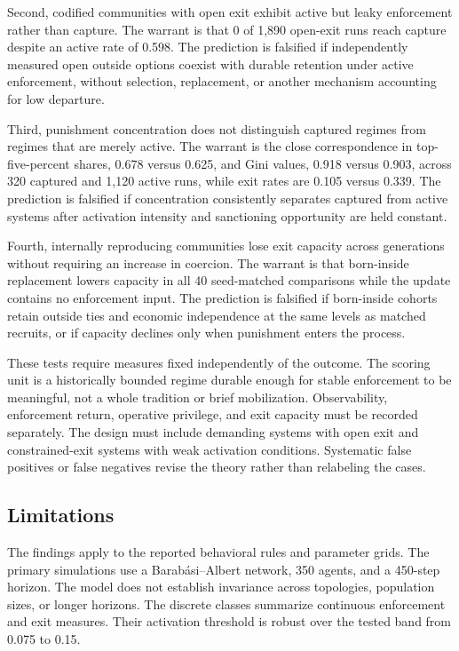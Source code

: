 \documentclass[12pt]{article}
\begin{document}
Second, codified communities with open exit exhibit active but leaky enforcement rather than capture. The warrant is
that 0 of 1,890 open-exit runs reach capture despite an active rate of 0.598. The prediction is falsified if
independently measured open outside options coexist with durable retention under active enforcement, without selection,
replacement, or another mechanism accounting for low departure.

Third, punishment concentration does not distinguish captured regimes from regimes that are merely active. The warrant
is the close correspondence in top-five-percent shares, 0.678 versus 0.625, and Gini values, 0.918 versus 0.903, across
320 captured and 1,120 active runs, while exit rates are 0.105 versus 0.339. The prediction is falsified if
concentration consistently separates captured from active systems after activation intensity and sanctioning opportunity
are held constant.

Fourth, internally reproducing communities lose exit capacity across generations without requiring an increase in
coercion. The warrant is that born-inside replacement lowers capacity in all 40 seed-matched comparisons while the
update contains no enforcement input. The prediction is falsified if born-inside cohorts retain outside ties and
economic independence at the same levels as matched recruits, or if capacity declines only when punishment enters the
process.

These tests require measures fixed independently of the outcome. The scoring unit is a historically bounded regime
durable enough for stable enforcement to be meaningful, not a whole tradition or brief mobilization. Observability,
enforcement return, operative privilege, and exit capacity must be recorded separately. The design must include
demanding systems with open exit and constrained-exit systems with weak activation conditions. Systematic false
positives or false negatives revise the theory rather than relabeling the cases.

\subsection{Limitations}

The findings apply to the reported behavioral rules and parameter grids. The primary simulations use a
Barab\'asi--Albert network, 350 agents, and a 450-step horizon. The model does not establish invariance across
topologies, population sizes, or longer horizons. The discrete classes summarize continuous enforcement and exit
measures. Their activation threshold is robust over the tested band from 0.075 to 0.15.
\end{document}
